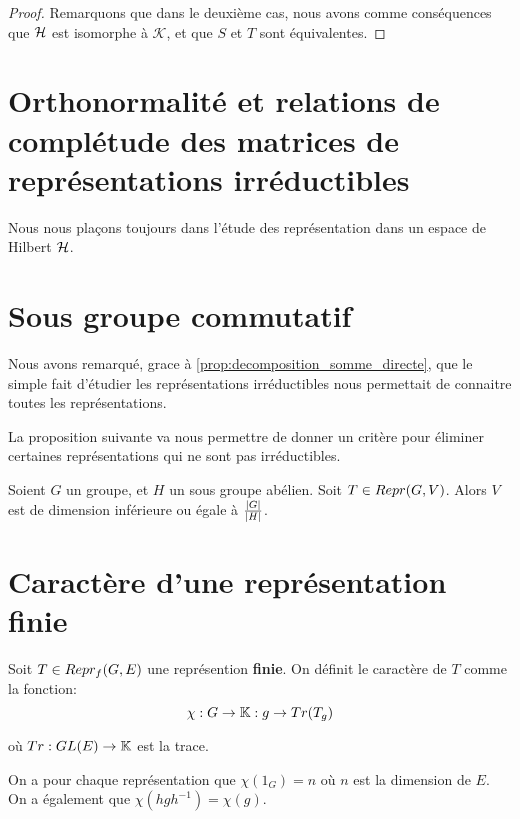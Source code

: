 \ifdefined\outputproof
\begin{proof}
	Remarquons que dans le deuxième cas, nous avons comme conséquences que
	$\mathcal{H}$ est isomorphe à $\mathcal{K}$, et que $S$ et $T$ sont
	équivalentes.
\end{proof}
\fi

\section{Orthonormalité et relations de complétude des matrices de
représentations irréductibles}

Nous nous plaçons toujours dans l'étude des représentation dans un espace de
Hilbert $\mathcal{H}$.



\section{Sous groupe commutatif}

Nous avons remarqué, grace à \ref{prop:decomposition_somme_directe}, que le
simple fait d'étudier les représentations irréductibles nous permettait de
connaitre toutes les représentations.

La proposition suivante va nous permettre de donner un critère pour
éliminer certaines représentations qui ne sont pas irréductibles.

\begin{proposition}
	Soient $G$ un groupe, et $H$ un sous groupe abélien.
	Soit $T \in Repr(G, V)$.
	Alors $V$ est de dimension inférieure ou égale à
	$\frac{|G|}{|H|}$.
\end{proposition}

\section{Caractère d'une représentation finie}

\begin{definition}
	Soit $T \in Repr_{f}(G, E)$ une représention \textbf{finie}.
	On définit le caractère de $T$ comme la fonction:
	\begin{equation}
		\chi : G \rightarrow \mathbb{K} : g \rightarrow Tr(T_{g})
	\end{equation}

	où $Tr : GL(E) \rightarrow \mathbb{K}$ est la trace.
\end{definition}

On a pour chaque représentation que $\chi(1_{G}) = n$ où $n$ est la dimension de
$E$.
On a également que $\chi(h g h^{-1}) = \chi(g)$.


